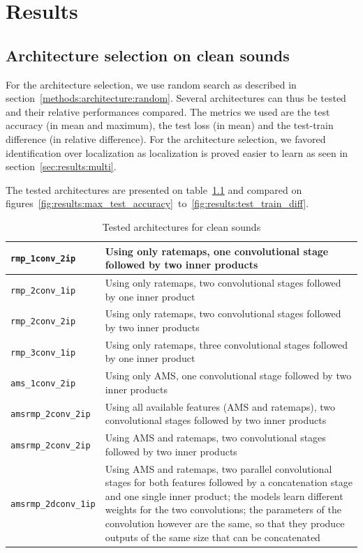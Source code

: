 \chapter{Results}
\label{sec:results}


\section{Architecture selection on clean sounds}
\label{sec:results:clean}

For the architecture selection, we use random search as described in section~\ref{methods:architecture:random}. Several architectures can thus be tested and their relative performances compared. The metrics we used are the test accuracy (in mean and maximum), the test loss (in mean) and the test-train difference (in relative difference). For the architecture selection, we favored identification over localization as localization is proved easier to learn as seen in section~\ref{sec:results:multi}.

The tested architectures are presented on table~\ref{fig:results:clean_table} and compared on figures~\ref{fig:results:max_test_accuracy}~to~\ref{fig:results:test_train_diff}.

\renewcommand{\arraystretch}{1.5}
\begin{table}[htb]
\begin{tabular}{|p{}|p{}|}
\hline
\verb+rmp_1conv_2ip+ & Using only ratemaps, one convolutional stage followed by two inner products \\
\hline
\verb+rmp_2conv_1ip+ & Using only ratemaps, two convolutional stages followed by one inner product \\
\hline
\verb+rmp_2conv_2ip+ & Using only ratemaps, two convolutional stages followed by two inner products \\
\hline
\verb+rmp_3conv_1ip+ & Using only ratemaps, three convolutional stages followed by one inner product \\
\hline
\verb+ams_1conv_2ip+ & Using only AMS, one convolutional stage followed by two inner products \\
\hline
\verb+amsrmp_2conv_2ip+ & Using all available features (AMS and ratemaps), two convolutional stages followed by two inner products \\
\hline
\verb+amsrmp_2conv_2ip+ & Using AMS and ratemaps, two convolutional stages followed by two inner products \\
\hline
\verb+amsrmp_2dconv_1ip+ & Using AMS and ratemaps, two parallel convolutional stages for both features followed by a concatenation stage and one single inner product; the models learn different weights for the two convolutions; the parameters of the convolution however are the same, so that they produce outputs of the same size that can be concatenated \\
\hline
\end{tabular}
\\
\caption{Tested architectures for clean sounds}
\label{fig:results:clean_table}
\end{table}

